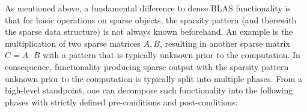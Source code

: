 \documentclass{article}
\begin{document}
\iffalse
\begin{listing}[H]
\begin{verbatim}
using namespace sparseblas;
csr_view<float> A(values, rowptr, colind, shape, nnz);
// auto A = matrix_handle(csr_view<float>(...), allocator);
// ... likewise for B
csr_view<float> C(m, n);
// auto C = matrix_handle(csr_view<float>(...), allocator);

multiply_elementwise_state_t state(allocator);
multiply_elementwise_inspect(policy, state, A, B, C); // optional
multiply_elementwise_compute(policy, state, A, B, C);
index_t nnz = state.get_result_nnz();
// allocate C arrays and put in C
multiply_elementwise_fill(policy, state, A, B, C);
// C structure and values are now able to be used
\end{verbatim}
\caption{Element-wise Multiplication, $C = A~.*B$}
\end{listing}
\fi


As mentioned above, a fundamental difference to dense BLAS functionality is that for basic operations on sparse objects, the sparsity pattern (and therewith the sparse data structure) is not always known beforehand. An example is the multiplication of two sparse matrices $A, B$, resulting in another sparse matrix $C = A\cdot B$ with a pattern that is typically unknown prior to the computation. In consequence, functionality producing sparse output with the sparsity pattern unknown prior to the computation is typically split into multiple phases. From a high-level standpoint, one can decompose such functionality into the following phases with strictly defined pre-conditions and post-conditions:
\end{document}
